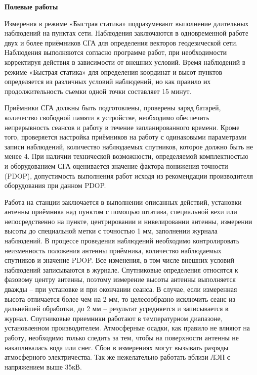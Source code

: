 \documentclass[a4paper]{article}
\begin{document}
\begin{newpage}
{        \par\textbf{Полевые работы}
        \par Измерения в режиме «Быстрая статика» подразумевают выполнение длительных наблюдений на пунктах сети. Наблюдения заключаются в одновременной работе двух и более приёмников СГА для определения векторов геодезической сети. Наблюдения выполняются согласно программе работ, при необходимости корректируя действия в зависимости от внешних условий. Время наблюдений в режиме «Быстрая статика» для определения координат и высот пунктов определяется из различных условий наблюдений, но как правило их продолжительность съемки одной точки составляет 15 минут.
        \par Приёмники СГА должны быть подготовлены, проверены заряд батарей, количество свободной памяти в устройстве, необходимо обеспечить непрерывность сеансов и работу в течение запланированного времени. Кроме того, проверяется настройка приёмников на работу с одинаковыми параметрами записи наблюдений, количество наблюдаемых спутников, которое должно быть не менее 4. При наличии технической возможности, определяемой комплектностью и оборудованием СГА оценивается значение фактора понижения точности (PDOP), допустимость выполнения работ исходя из рекомендации производителя оборудования при данном PDOP.
        \par Работа на станции заключается в выполнении описанных действий, установки антенны приёмника над пунктом с помощью штатива, специальной вехи или непосредственно на пункте, центрировании и нивелировании антенны, измерении высоты до специальной метки с точностью 1 мм, заполнении журнала наблюдений. В процессе проведения наблюдений необходимо контролировать неизменность положения антенны приёмника, количество наблюдаемых спутников и значение PDOP. Все изменения, в том числе внешних условий наблюдений записываются в журнале. Спутниковые определения относятся к фазовому центру антенны, поэтому измерение высоты антенны выполняется дважды – при установке и при окончании сеанса. В случае, если измеренная высота отличается более чем на 2 мм, то целесообразно исключить сеанс из дальнейшей обработки, до 2 мм – результат усредняется и записывается в журнал. Спутниковые приемники работают в температурном диапазоне, установленном производителем. Атмосферные осадки, как правило не влияют на работу, необходимо только следить за тем, чтобы на поверхности антенны не накапливалась вода или снег. Сбои в измерениях могут вызывать разряды атмосферного электричества. Так же нежелательно работать вблизи ЛЭП с напряжением выше 35кВ.\\
}
\end{newpage}
\end{document}
